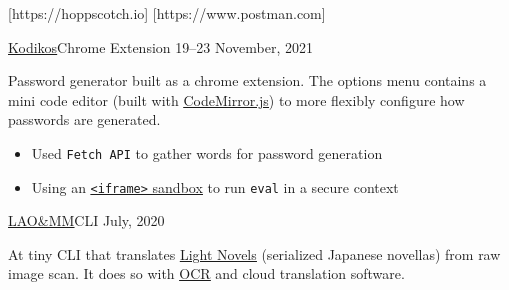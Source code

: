 \documentclass[10pt,a4paper,ragged2e,withhyper]{altacv}
\begin{document}
\begin{paracol}{2}
		[https://hoppscotch.io]
		[https://www.postman.com]



		\cvevent
		{\href{https://github.com/jaacko-torus/kodikos/}{\uline{Kodikos}}{\hr}Chrome Extension}
		{{\CVTagHTMLCSS}{\CVTagJavaScript}}
		{19--23 November, 2021}{}
		\vspace{-0.3cm}
		\begin{justify}
			Password generator built as a chrome extension. The options menu contains a mini code editor (built with \href{https://codemirror.net/}{\uline{CodeMirror.js}}) to more flexibly configure how passwords are generated.
		\end{justify}
		\vspace{-0.2cm}
		\smallskip
		\begin{itemize}
			\item Used \texttt{Fetch API} to gather words for password generation
			\item Using an \href{https://developer.mozilla.org/en-US/docs/Web/HTTP/Headers/Content-Security-Policy/sandbox/}{\uline{\texttt{<iframe>} sandbox}} to run \texttt{eval} in a secure context
		\end{itemize}

		\divider

		\cvevent
		{\href{https://github.com/jaacko-torus/lao-mm/}{\uline{LAO\&MM}}{\hr}CLI}
		{{\CVTagRuby}{\CVTagOCRA}}
		{July, 2020}{}
		\vspace{-0.3cm}
		\begin{justify}
			At tiny CLI that translates \href{https://en.wikipedia.org/wiki/Light_novel}{\uline{Light Novels}} (serialized Japanese novellas) from raw image scan. It does so with \href{http://capture2text.sourceforge.net/}{\uline{OCR}} and cloud translation software.
		\end{justify}

		\divider


\end{paracol}
\end{document}
